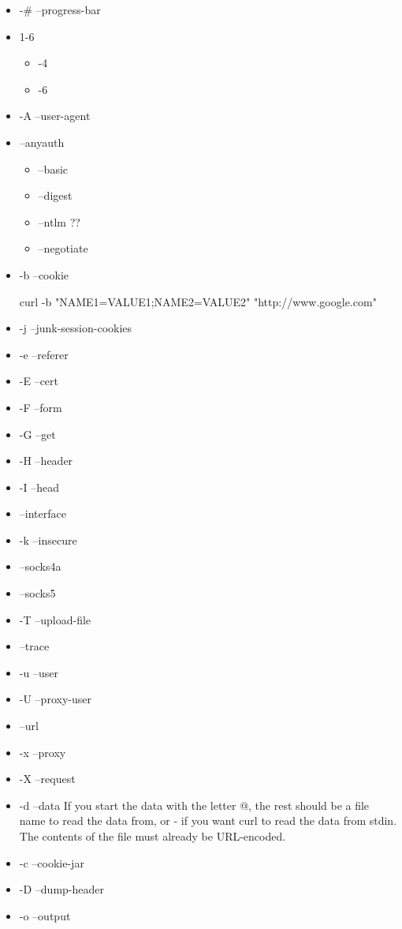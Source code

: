 \begin{itemize}
\item -\# --progress-bar
\item 1-6
	\begin{itemize}
	\item -4
	\item -6
	\end{itemize}
\item -A --user-agent
\item --anyauth
	\begin{itemize}
	\item --basic
	\item --digest
	\item --ntlm ??
	\item --negotiate
	\end{itemize}	
\item -b --cookie
\begin{Bash}
curl -b "NAME1=VALUE1;NAME2=VALUE2" "http://www.google.com"
\end{Bash}	
\item -j --junk-session-cookies

\item -e --referer
\item -E --cert
\item -F --form

\item -G --get
\item -H --header

\item -I --head

\item --interface

\item -k --insecure

\item --socks4a
\item --socks5

\item -T --upload-file

\item --trace

\item -u --user
\item -U --proxy-user

\item --url

\item -x --proxy

\item -X --request


\item -d --data
If  you  start  the data with the letter @, the rest should be a file name to read the data from, or - if you want curl  to  read the  data  from stdin.  The contents of the file must already be URL-encoded. 
\item -c --cookie-jar
\item -D --dump-header
\item -o --output

\end{itemize}

